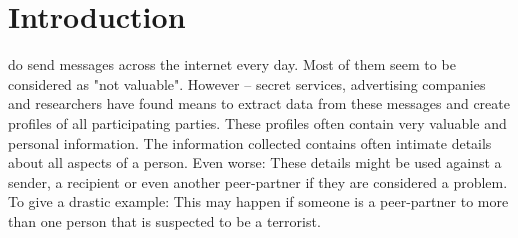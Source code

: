 \documentclass[12pt,journal,compsoc]{IEEEtran}
\begin{document}
\section{Introduction}
%
%



% 
% 
% 
% 
 do send messages across the internet every day. Most of them seem to be considered as "not valuable". However -- secret services, advertising companies and researchers have found means to extract data from these messages and create profiles of all participating parties. These profiles often contain very valuable and personal information. The information collected contains often intimate details about all aspects of a person. Even worse: These details might be used against a sender, a recipient or even another peer-partner if they are considered a problem. To give a drastic example: This may happen if someone is a peer-partner to more than one person that is suspected to be a terrorist.\par
\end{document}

